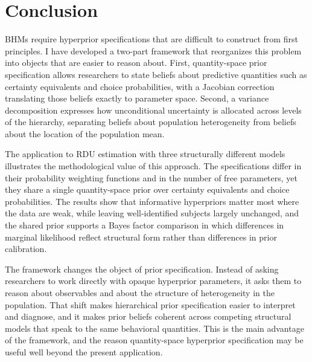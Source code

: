 \documentclass[12pt,a4paper]{article}
\theoremstyle{definition}
\theoremstyle{remark}
\begin{document}
\section{Conclusion}
\label{sec:conclusion}

BHMs require hyperprior specifications that are difficult to construct from
first principles. I have developed a two-part framework that reorganizes
this problem into objects that are easier to reason about. First,
quantity-space prior specification allows researchers to state beliefs about
predictive quantities such as certainty equivalents and choice probabilities,
with a Jacobian correction translating those beliefs exactly to parameter
space. Second, a variance decomposition expresses how unconditional uncertainty
is allocated across levels of the hierarchy, separating beliefs about
population heterogeneity from beliefs about the location of the population
mean.

The application to RDU estimation with three structurally different models
illustrates the methodological value of this approach. The specifications
differ in their probability weighting functions and in the number of free
parameters, yet they share a single quantity-space prior over certainty
equivalents and choice probabilities. The results show that informative
hyperpriors matter most where the data are weak, while leaving well-identified
subjects largely unchanged, and the shared prior supports a Bayes factor
comparison in which differences in marginal likelihood reflect structural
form rather than differences in prior calibration.

The framework changes the object of prior specification. Instead of asking
researchers to work directly with opaque hyperprior parameters, it asks them to
reason about observables and about the structure of heterogeneity in the
population. That shift makes hierarchical prior specification easier to
interpret and diagnose, and it makes prior beliefs coherent across competing
structural models that speak to the same behavioral quantities. This is the
main advantage of the framework, and the reason quantity-space hyperprior
specification may be useful well beyond the present application.


{\singlespacing{}}
\end{document}
